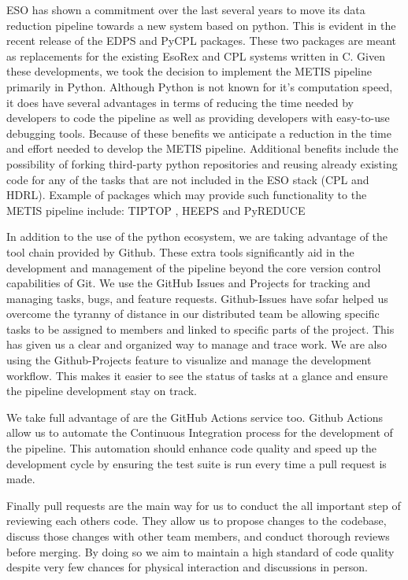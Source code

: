 \documentclass[a4paper]{spie}  %
\begin{document}
ESO has shown a commitment over the last several years to move its data reduction pipeline towards a new system based on python. 
This is evident in the recent release of the EDPS \cite{edps} and PyCPL \cite{pycpl} packages.
These two packages are meant as replacements for the existing EsoRex and CPL systems written in C.
Given these developments, we took the decision to implement the METIS pipeline primarily in Python.
Although Python is not known for it's computation speed, it does have several advantages in terms of reducing the time needed by developers to code the pipeline as well as providing developers with easy-to-use debugging tools. 
Because of these benefits we anticipate a reduction in the time and effort needed to develop the METIS pipeline.
Additional benefits include the possibility of forking third-party python repositories and reusing already existing code for any of the tasks that are not included in the ESO stack (CPL and HDRL). 
Example of packages which may provide such functionality to the METIS pipeline include: TIPTOP \cite{tiptop}, HEEPS \cite{HEEPS} and PyREDUCE \cite{pyreduce}

In addition to the use of the python ecosystem, we are taking advantage of the tool chain provided by Github. 
These extra tools significantly aid in the development and management of the pipeline beyond the core version control capabilities of Git. 
We use the GitHub Issues and Projects for tracking and managing tasks, bugs, and feature requests. 
Github-Issues have sofar helped us overcome the tyranny of distance in our distributed team be allowing specific tasks to be assigned to members and linked to specific parts of the project. 
This has given us a clear and organized way to manage and trace work. 
We are also using the Github-Projects feature to visualize and manage the development workflow. 
This makes it easier to see the status of tasks at a glance and ensure the pipeline development stay on track.

We take full advantage of are the GitHub Actions service too. 
Github Actions allow us to automate the Continuous Integration process for the development of the pipeline. 
This automation should enhance code quality and speed up the development cycle by ensuring the test suite is run every time a pull request is made. 

Finally pull requests are the main way for us to conduct the all important step of reviewing each others code. 
They allow us to propose changes to the codebase, discuss those changes with other team members, and conduct thorough reviews before merging. 
By doing so we aim to maintain a high standard of code quality despite very few chances for physical interaction and discussions in person.
\end{document}
